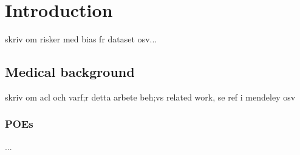 \chapter{Introduction}



skriv om risker med bias fr dataset osv...

\section{Medical background}
skriv om acl och varf;r detta arbete beh;vs
related work, se ref i mendeley osv
\subsection{POEs}
...

